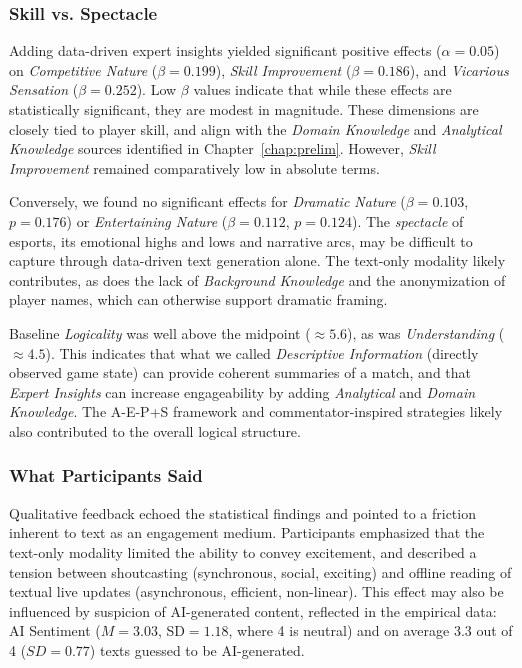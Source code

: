\subsubsection{Skill vs. Spectacle}
Adding data-driven expert insights yielded significant positive effects ($\alpha = 0.05$) on \textit{Competitive Nature} ($\beta=0.199$), \textit{Skill Improvement} ($\beta=0.186$), and \textit{Vicarious Sensation} ($\beta=0.252$). Low $\beta$ values indicate that while these effects are statistically significant, they are modest in magnitude. These dimensions are closely tied to player skill, and align with the \textit{Domain Knowledge} and \textit{Analytical Knowledge} sources identified in Chapter~\ref{chap:prelim}. However, \textit{Skill Improvement} remained comparatively low in absolute terms.

Conversely, we found no significant effects for \textit{Dramatic Nature} ($\beta=0.103$, $p=0.176$) or \textit{Entertaining Nature} ($\beta=0.112$, $p=0.124$). The \textit{spectacle} of esports, its emotional highs and lows and narrative arcs, may be difficult to capture through data-driven text generation alone. The text-only modality likely contributes, as does the lack of \textit{Background Knowledge} and the anonymization of player names, which can otherwise support dramatic framing.

Baseline \textit{Logicality} was well above the midpoint ($\approx 5.6$), as was \textit{Understanding} ($\approx 4.5$). This indicates that what we called \textit{Descriptive Information} (directly observed game state) can provide coherent summaries of a match, and that \textit{Expert Insights} can increase engageability by adding \textit{Analytical} and \textit{Domain Knowledge}. The A-E-P+S framework and commentator-inspired strategies likely also contributed to the overall logical structure.

\subsubsection{What Participants Said}
Qualitative feedback echoed the statistical findings and pointed to a friction inherent to text as an engagement medium. Participants emphasized that the text-only modality limited the ability to convey excitement, and described a tension between shoutcasting (synchronous, social, exciting) and offline reading of textual live updates (asynchronous, efficient, non-linear). This effect may also be influenced by suspicion of AI-generated content, reflected in the empirical data: AI Sentiment ($M=3.03$, SD$=1.18$, where 4 is neutral) and on average 3.3 out of 4 ($SD=0.77$) texts guessed to be AI-generated.

